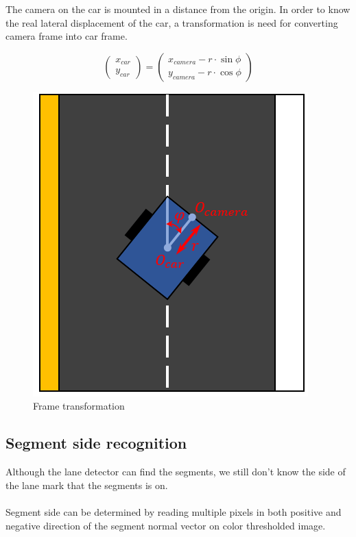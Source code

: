 \documentclass{article}
\begin{document}
The camera on the car is mounted in a distance from the origin. In order to know the real lateral displacement of the car, a transformation is need for converting camera frame into car frame.

\[
\begin{pmatrix} x_{car} \\ y_{car} \end{pmatrix} = 
\begin{pmatrix} x_{camera} - r \cdot \sin\phi \\ y_{camera} - r \cdot \cos\phi \end{pmatrix}
\]

\begin{figure}[ht]
  \label{fig:frame_transformation}
  \centering
  \includegraphics[scale=0.7]{graphs/frame_transformation.PNG}
  \caption{Frame transformation}
\end{figure}
\FloatBarrier

\subsection{Segment side recognition}

Although the lane detector can find the segments, we still don't know the side of the lane mark that the segments is on.
\\
\\
Segment side can be determined by reading multiple pixels in both positive and negative direction of the segment normal vector on color thresholded image. 
\end{document}
